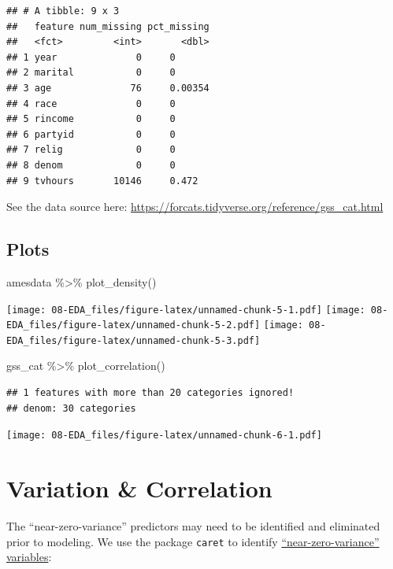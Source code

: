 \documentclass[
]{book}
\newenvironment{Shaded}{\begin{snugshade}}{\end{snugshade}}
\newcommand{\FunctionTok}[1]{\textcolor[rgb]{0.00,0.00,0.00}{#1}}
\newcommand{\NormalTok}[1]{#1}
\newcommand{\SpecialCharTok}[1]{\textcolor[rgb]{0.00,0.00,0.00}{#1}}
\begin{document}
\begin{verbatim}
## # A tibble: 9 x 3
##   feature num_missing pct_missing
##   <fct>         <int>       <dbl>
## 1 year              0     0      
## 2 marital           0     0      
## 3 age              76     0.00354
## 4 race              0     0      
## 5 rincome           0     0      
## 6 partyid           0     0      
## 7 relig             0     0      
## 8 denom             0     0      
## 9 tvhours       10146     0.472
\end{verbatim}

See the data source here: \url{https://forcats.tidyverse.org/reference/gss_cat.html}

\hypertarget{plots}{%
\subsection{Plots}\label{plots}}

\begin{Shaded}
\begin{Highlighting}[]
\NormalTok{amesdata  }\SpecialCharTok{\%\textgreater{}\%} \FunctionTok{plot\_density}\NormalTok{()}
\end{Highlighting}
\end{Shaded}

\texttt{[image: 08-EDA\_files/figure-latex/unnamed-chunk-5-1.pdf]} \texttt{[image: 08-EDA\_files/figure-latex/unnamed-chunk-5-2.pdf]} \texttt{[image: 08-EDA\_files/figure-latex/unnamed-chunk-5-3.pdf]}

\begin{Shaded}
\begin{Highlighting}[]
\NormalTok{gss\_cat  }\SpecialCharTok{\%\textgreater{}\%} \FunctionTok{plot\_correlation}\NormalTok{()}
\end{Highlighting}
\end{Shaded}

\begin{verbatim}
## 1 features with more than 20 categories ignored!
## denom: 30 categories
\end{verbatim}

\texttt{[image: 08-EDA\_files/figure-latex/unnamed-chunk-6-1.pdf]}

\hypertarget{variation-correlation}{%
\section{Variation \& Correlation}\label{variation-correlation}}

The ``near-zero-variance'' predictors may need to be identified and eliminated prior to modeling. We use the package \texttt{caret} to identify \href{https://topepo.github.io/caret/pre-processing.html}{``near-zero-variance'' variables}:
\end{document}
